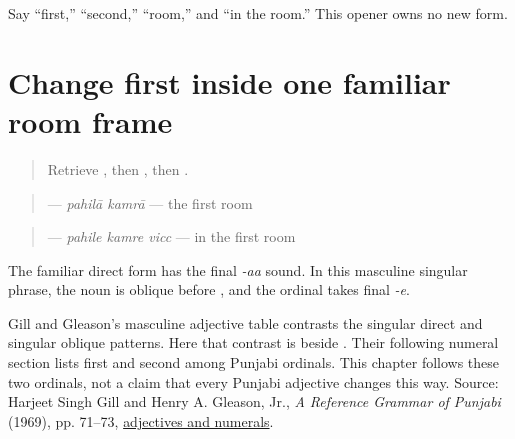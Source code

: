 \begin{tcolorbox}[breakable,colback=teal!4,colframe=teal!35!black,title={Before you move on}]
Say “first,” “second,” “room,” and “in the room.” This opener owns no new form.
\end{tcolorbox}
\section[\texorpdfstring{\pa{ਪਹਿਲੇ} (pahile)}{ਪਹਿਲੇ (pahile)}]{Change first inside one familiar room frame}

\label{lesson:PA-C193-pahile}



\begin{quote}
Retrieve \textbf{}, then \textbf{}, then \textbf{ }.
\end{quote}

\begin{grammarlens}[title={Grammar Lens: direct owner}]
\begin{quote}
\textbf{ } — \emph{pahilā kamrā} — the first room
\end{quote}

\begin{quote}
\textbf{  } — \emph{pahile kamre vicc} — in the first room
\end{quote}

The familiar direct form has the final \emph{-aa} sound. In this masculine singular phrase, the noun is oblique before \textbf{}, and the ordinal takes final \emph{-e}.
\end{grammarlens}

\begin{grammarlens}[title={Grammar Lens: source boundary}]
Gill and Gleason's masculine adjective table contrasts the singular direct and singular oblique patterns. Here that contrast is \textbf{} beside \textbf{}. Their following numeral section lists first \textbf{} and second \textbf{} among Punjabi ordinals. This chapter follows these two ordinals, not a claim that every Punjabi adjective changes this way. Source: Harjeet Singh Gill and Henry A. Gleason, Jr., \emph{A Reference Grammar of Punjabi} (1969), pp. 71–73, \href{https://apnaorg.com/books/english/a-reference-grammar-of-punjabi/a-reference-grammar-of-punjabi.pdf}{adjectives and numerals}.
\end{grammarlens}

